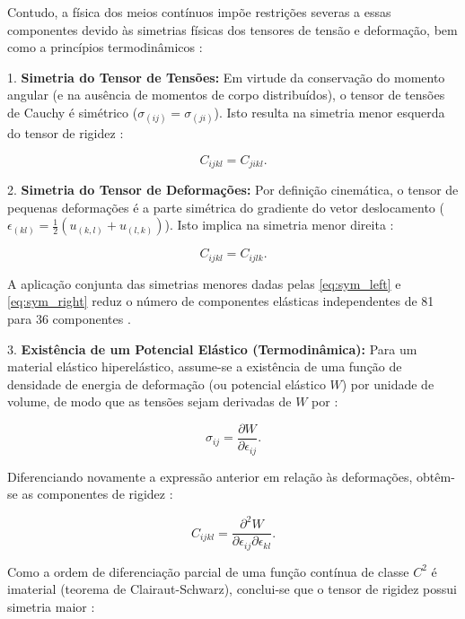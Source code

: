 Contudo, a física dos meios contínuos impõe restrições severas a essas componentes devido às simetrias físicas dos tensores de tensão e deformação, bem como a princípios termodinâmicos \cite{lai2010continuum}:

1. \textbf{Simetria do Tensor de Tensões:} Em virtude da conservação do momento angular (e na ausência de momentos de corpo distribuídos), o tensor de tensões de Cauchy é simétrico ($\sigma_{(ij)} = \sigma_{(ji)}$). Isto resulta na simetria menor esquerda do tensor de rigidez \cite{Sadd2009}:

\begin{equation}
    C_{ijkl} = C_{jikl}.
\end{equation} \label{eq:sym_left}

2. \textbf{Simetria do Tensor de Deformações:} Por definição cinemática, o tensor de pequenas deformações é a parte simétrica do gradiente do vetor deslocamento ($\epsilon_{(kl)} = \frac{1}{2}(u_{(k,l)} + u_{(l,k)})$). Isto implica na simetria menor direita \cite{Sadd2009}:

\begin{equation}
    C_{ijkl} = C_{ijlk}.
\end{equation} \label{eq:sym_right}

A aplicação conjunta das simetrias menores dadas pelas \eqref{eq:sym_left} e \eqref{eq:sym_right} reduz o número de componentes elásticas independentes de 81 para 36 componentes \cite{lai2010continuum}.

3. \textbf{Existência de um Potencial Elástico (Termodinâmica):} Para um material elástico hiperelástico, assume-se a existência de uma função de densidade de energia de deformação (ou potencial elástico $W$) por unidade de volume, de modo que as tensões sejam derivadas de $W$ por \cite{Timoshenko_1951}:

\begin{equation}
    \sigma_{ij} = \frac{\partial W}{\partial \epsilon_{ij}}.
\end{equation}\label{eq:potential_w}

Diferenciando novamente a expressão anterior em relação às deformações, obtêm-se as componentes de rigidez \cite{lai2010continuum}:

\begin{equation}
    C_{ijkl} = \frac{\partial^2 W}{\partial \epsilon_{ij} \partial \epsilon_{kl}}. 
\end{equation}\label{eq:stiff_deriv}

Como a ordem de diferenciação parcial de uma função contínua de classe $C^2$ é imaterial (teorema de Clairaut-Schwarz), conclui-se que o tensor de rigidez possui simetria maior \cite{lai2010continuum}:

